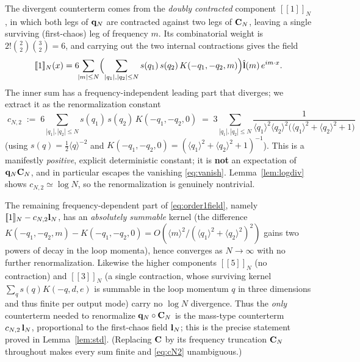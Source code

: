 The divergent counterterm comes from the \emph{doubly contracted} component
$[\![1]\!]_N$, in which both legs of $\mathbf{q}_N$ are contracted against two legs of
$\mathbf{C}_N$, leaving a single surviving (first-chaos) leg of frequency $m$. Its
combinatorial weight is $2!\binom22\binom32=6$, and carrying out the two internal
contractions gives the field
\begin{equation}\label{eq:order1field}
[\![1]\!]_N(x)=6\!\!\sum_{|m|\le N}\Bigl(\sum_{|q_1|,|q_2|\le N}s(q_1)\,s(q_2)\,K(-q_1,-q_2,m)\Bigr)\hat{\mathbf{l}}(m)\,e^{im\cdot x}.
\end{equation}
The inner sum has a frequency-independent leading part that diverges; we extract it
as the renormalization constant
\begin{equation}\label{eq:cN2}
\boxed{\;c_{N,2}\;:=\;6\sum_{|q_1|,|q_2|\le N}s(q_1)\,s(q_2)\,K(-q_1,-q_2,0)
\;=\;3\!\!\sum_{|q_1|,|q_2|\le N}\frac{1}{\langle q_1\rangle^2\langle q_2\rangle^2\bigl(\langle q_1\rangle^2+\langle q_2\rangle^2+1\bigr)}\;}
\end{equation}
(using $s(q)=\tfrac12\langle q\rangle^{-2}$ and $K(-q_1,-q_2,0)=(\langle q_1\rangle^2+\langle q_2\rangle^2+1)^{-1}$).
This is a manifestly \emph{positive}, explicit deterministic constant; it is
\textbf{not} an expectation of $\mathbf{q}_N\mathbf{C}_N$, and in particular escapes the
vanishing \eqref{eq:vanish}. Lemma~\ref{lem:logdiv} shows $c_{N,2}\simeq\log N$, so the
renormalization is genuinely nontrivial.

\begin{remark}\label{rem:masstype}
The remaining frequency-dependent part of \eqref{eq:order1field}, namely
$[\![1]\!]_N-c_{N,2}\mathbf{l}_N$, has an \emph{absolutely summable} kernel
(the difference $K(-q_1,-q_2,m)-K(-q_1,-q_2,0)=O(\langle m\rangle^2/(\langle q_1\rangle^2+\langle q_2\rangle^2)^2)$
gains two powers of decay in the loop momenta), hence converges as $N\to\infty$ with
no further renormalization. Likewise the higher components $[\![5]\!]_N$ (no
contraction) and $[\![3]\!]_N$ (a single contraction, whose surviving kernel
$\sum_q s(q)K(-q,d,e)$ is summable in the loop momentum $q$ in three dimensions and
thus finite per output mode) carry no $\log N$ divergence. Thus the \emph{only}
counterterm needed to renormalize $\mathbf{q}_N\circ\mathbf{C}_N$ is the mass-type counterterm
$c_{N,2}\,\mathbf{l}_N$, proportional to the first-chaos field $\mathbf{l}_N$; this is the precise
statement proved in Lemma~\ref{lem:std}. (Replacing $\mathbf{C}$ by its frequency truncation
$\mathbf{C}_N$ throughout makes every sum finite and \eqref{eq:cN2} unambiguous.)
\end{remark}

